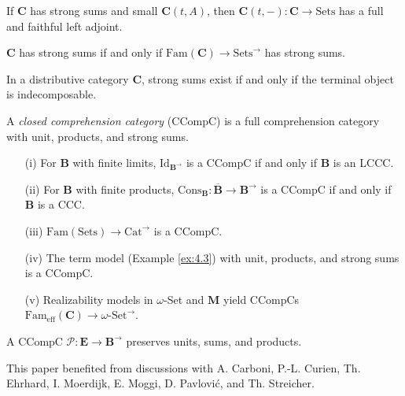 \documentclass{article}
\begin{document}
\begin{lemma}
\label{lem:5.10}
If $\mathbf{C}$ has strong sums and small $\mathbf{C}(t, A)$, then $\mathbf{C}(t, -) : \mathbf{C} \to \text{Sets}$ has a full and faithful left adjoint.
\end{lemma}

\begin{lemma}
\label{lem:5.11}
$\mathbf{C}$ has strong sums if and only if $\text{Fam}(\mathbf{C}) \to \text{Sets}^{\to}$ has strong sums.
\end{lemma}

\begin{proposition}
\label{prop:5.12}
In a distributive category $\mathbf{C}$, strong sums exist if and only if the terminal object is indecomposable.
\end{proposition}

\begin{definition}
\label{def:5.13}
A \emph{closed comprehension category} (CCompC) is a full comprehension category with unit, products, and strong sums.
\end{definition}

\begin{example}
\label{ex:5.14}
\begin{enumerate}
    \item[(i)] For $\mathbf{B}$ with finite limits, $\text{Id}_{\mathbf{B}^{\to}}$ is a CCompC if and only if $\mathbf{B}$ is an LCCC.
    \item[(ii)] For $\mathbf{B}$ with finite products, $\text{Cons}_{\mathbf{B}} : \overline{\mathbf{B}} \to \mathbf{B}^{\to}$ is a CCompC if and only if $\mathbf{B}$ is a CCC.
    \item[(iii)] $\text{Fam}(\text{Sets}) \to \text{Cat}^{\to}$ is a CCompC.
    \item[(iv)] The term model (Example \ref{ex:4.3}) with unit, products, and strong sums is a CCompC.
    \item[(v)] Realizability models in $\omega$-Set and $\mathbf{M}$ yield CCompCs $\text{Fam}_{\text{eff}}(\mathbf{C}) \to \omega\text{-Set}^{\to}$.
\end{enumerate}
\end{example}

\begin{lemma}
\label{lem:5.15}
A CCompC $\mathscr{P} : \mathbf{E} \to \mathbf{B}^{\to}$ preserves units, sums, and products.
\end{lemma}

\begin{acknowledgment}
This paper benefited from discussions with A. Carboni, P.-L. Curien, Th. Ehrhard, I. Moerdijk, E. Moggi, D. Pavlović, and Th. Streicher.
\end{acknowledgment}
\end{document}
